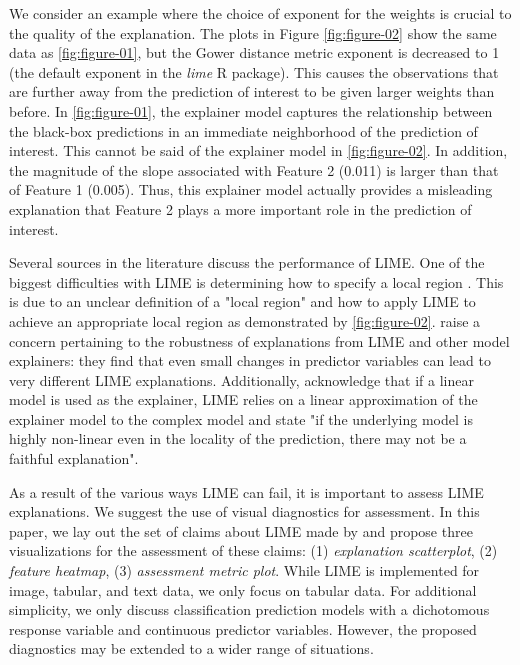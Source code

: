 \documentclass[AMS,STIX2COL]{WileyNJD-v2}\usepackage[]{graphicx}\usepackage[]{color}
\begin{document}
We consider an example where the choice of exponent for the weights is crucial to the quality of the explanation. The plots in Figure \ref{fig:figure-02} show the same data as \autoref{fig:figure-01}, but the Gower distance metric exponent is decreased to 1 (the default exponent in the \emph{lime} R package). This causes the observations that are further away from the prediction of interest to be given larger weights than before. In \autoref{fig:figure-01}, the explainer model captures the relationship between the black-box predictions in an immediate neighborhood of the prediction of interest. This cannot be said of the explainer model in \autoref{fig:figure-02}. In addition, the magnitude of the slope associated with Feature 2  (0.011) is larger than that of Feature 1 (0.005). Thus, this explainer model actually provides a misleading explanation that Feature 2 plays a more important role in the prediction of interest.

Several sources in the literature discuss the performance of LIME. One of the biggest difficulties with LIME is determining how to specify a local region \citep{laugel:2018} \citep{molnar:2019}. This is due to an unclear definition of a "local region" and how to apply LIME to achieve an appropriate local region as demonstrated by \autoref{fig:figure-02}. \citet{alvarezmelis:2018} raise a concern pertaining to the robustness of explanations from LIME and other model explainers: they find that even small changes in predictor variables can lead to very different LIME explanations. Additionally, \citet{ribeiro:2016} acknowledge that if a linear model is used as the explainer, LIME relies on a linear approximation of the explainer model to the complex model and state "if the underlying model is highly non-linear even in the locality of the prediction, there may not be a faithful explanation".

As a result of the various ways LIME can fail, it is important to assess LIME explanations. We suggest the use of visual diagnostics for assessment. In this paper, we lay out the set of claims about LIME made by \citet{ribeiro:2016} and propose three visualizations for the assessment of these claims: (1) \emph{explanation scatterplot}, (2) \emph{feature heatmap}, (3) \emph{assessment metric plot}. While LIME is implemented for image, tabular, and text data, we only focus on tabular data. For additional simplicity, we only discuss classification prediction models with a dichotomous response variable and continuous predictor variables. However, the proposed diagnostics may be extended to a wider range of situations.
\end{document}

